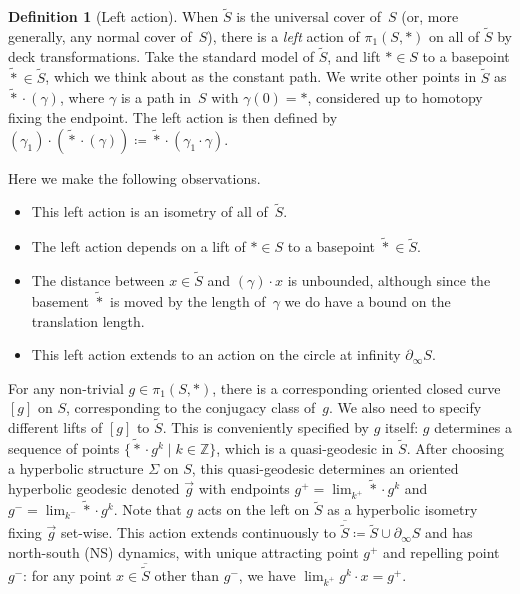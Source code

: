 \documentclass[11pt]{amsart}
\newcommand{\ora}[1]{\overrightarrow{#1}}
\numberwithin{equation}{section}
\numberwithin{figure}{section}
\theoremstyle{definition}
\newtheorem{definition}[theorem]{Definition}
\theoremstyle{plain}
\newcommand\bbZ{\ensuremath{\mathbb{Z}}}
\newcommand*{\wt}[1]{\widetilde{#1}}
\begin{document}
\begin{definition}[Left action]
When $\wt S$ is the universal cover of~$S$ (or, more generally, any
normal cover of~$S$), there is a \emph{left} action of $\pi_1(S,\ast)$
on all of $\wt S$ by deck transformations. Take
the standard model of $\wt S$, and lift $\ast \in S$ to a basepoint
$\wt \ast \in \wt S$, which we think about as the constant path. We
write other
points in $\wt S$ as $\wt{\ast} \cdot (\gamma)$, where $\gamma$ is a
path in~$S$ with $\gamma(0) = \ast$, considered up to homotopy fixing
the endpoint. The left action is then
defined by
$(\gamma_1) \cdot (\wt \ast \cdot (\gamma)) \coloneqq
\wt \ast \cdot (\gamma_1 \cdot \gamma)$.

\end{definition}
Here we make the following observations.
\begin{itemize}
\item This left action is an isometry of all of~$\wt S$.
\item The left action depends on a lift of
  $\ast \in S$ to a basepoint  $\wt \ast \in \wt S$.
\item The distance between $x \in \wt S$ and $(\gamma) \cdot x$
  is unbounded, although since the basement $\wt \ast$ is moved by the
  length of~$\gamma$ we do have a bound on
  the translation length.
\item This left action extends to an action on the circle at infinity $\partial_{\infty} S$.
\end{itemize}

For any non-trivial $g \in \pi_1(S,*)$, there is a corresponding
oriented closed curve $[g]$ on $S$, corresponding to the conjugacy
class of~$g$. We also need to specify different lifts of $[g]$ to
$\wt S$. This is conveniently specified by $g$ itself: $g$ determines
a sequence of points $\{\wt \ast \cdot g^k \mid k \in \bbZ\}$,
which is a
quasi-geodesic in $\wt S$. After choosing a hyperbolic structure
$\Sigma$ on $S$, this quasi-geodesic determines an oriented hyperbolic
geodesic
denoted $\ora{g}$ with endpoints $g^+ = \lim_{k^+} \wt \ast \cdot g^k$ 
and $g^- = \lim_{k^-} \wt \ast \cdot g^k$. Note that $g$
acts on the left on $\wt S$ as a hyperbolic isometry
fixing $\ora{g}$ set-wise. This action
extends continuously to $\overline{\wt S} \coloneqq \wt S \cup \partial_{\infty} S$ and has north-south (NS) dynamics, with unique
attracting point $g^+$ and repelling point $g^-$: for any point
$x \in \overline{\wt S}$ other
than $g^-$, we have $\lim _{k^+} g^k \cdot x = g^+$.
\end{document}
